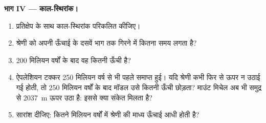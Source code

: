 \begin{problem}
\medskip
\noindent\textbf{भाग IV --- काल-स्थिरांक।}
\begin{enumerate}[resume]
  \item प्रतिक्षेप के साथ काल-स्थिरांक परिकलित कीजिए।
  \item श्रेणी को अपनी ऊँचाई के दसवें भाग तक गिरने में कितना समय लगता है?
  \item 200 मिलियन वर्षों के बाद वह कितनी ऊँची है?
  \item ऐपलेशियन टक्कर 250 मिलियन वर्ष से भी पहले समाप्त हुई।
        यदि श्रेणी कभी फिर से ऊपर न उठाई गई होती, तो 250 मिलियन वर्षों के बाद मॉडल उसे
        कितनी ऊँची छोड़ता? माउंट मिचेल अब भी समुद्र से \qty{2037}{m}
        ऊपर उठा है: इससे क्या संकेत मिलता है?
  \item सारांश दीजिए: कितने मिलियन वर्षों में श्रेणी की माध्य ऊँचाई
        आधी होती है?
\end{enumerate}
\end{problem}
